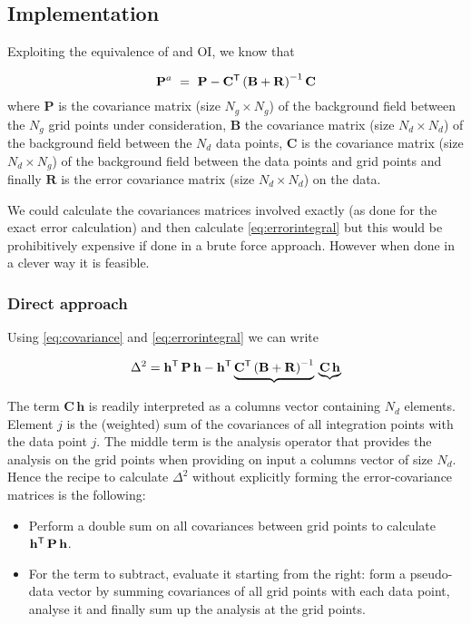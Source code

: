 \subsection{Implementation}
Exploiting the equivalence of \diva and OI, we know that

\begin{equation}
\mathbf{P}^a ~=~ \mathbf{P} -  {\mathbf{C}}^\mathsf{T} \left( \mathbf{B}+\mathbf{R} \right)^{-1} \mathbf{C}
\label{eq:covariance}
\end{equation}
where $\mathbf{P}$ is the covariance matrix (size $N_g\times N_g$) of the background field between the $N_g$ grid points under consideration, $\mathbf{B}$ 
the covariance matrix (size $N_d \times N_d$) of the background field between the $N_d$ data points, $\mathbf{C}$  is the
 covariance matrix (size $N_d \times N_g$) of the background field between the  data points and grid points and finally $\mathbf{R}$ is the error covariance matrix (size $N_d \times N_d$) on the data.
 
We could calculate the covariances matrices involved exactly (as done for the exact error calculation) and then calculate \eqref{eq:errorintegral} but this would be prohibitively expensive if done in a brute force approach. However when done in a clever way it is feasible.

\subsubsection{Direct approach}

Using \eqref{eq:covariance} and \eqref{eq:errorintegral} we can write

 \begin{equation}
 \Delta^2 = {\mathbf{h}}^\mathsf{T}\, \mathbf{P} \, \mathbf{h} - {\mathbf{h}}^\mathsf{T} \underbrace{{\mathbf{C}}^\mathsf{T} \left( \mathbf{B}+\mathbf{R} \right)^{-1}} \, \underbrace{\mathbf{C}  \, \mathbf{h}}
 \label{eq:totalerror}
 \end{equation}
 
The term $\mathbf{C}  \, \mathbf{h}$ is readily interpreted as a columns vector containing $N_d$ elements. Element $j$ is the (weighted) sum of the covariances of all integration points with the data point $j$. The middle term is the analysis operator that provides the analysis on the grid points when providing on input a columns vector of size $N_d$. Hence the recipe to calculate $\Delta^2$ without explicitly forming the error-covariance matrices is the following:
\begin{itemize}
\item Perform a double sum on all covariances between grid points to calculate ${\mathbf{h}}^\mathsf{T} \, \mathbf{P} \, \mathbf{h}$.
\item For the term to subtract, evaluate it starting from the right: form a pseudo-data vector by summing covariances of all grid points with each data point, analyse it and finally sum up the analysis at the grid points.
\end{itemize}

